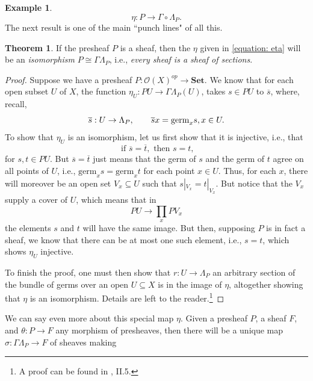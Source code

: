 \documentclass[11pt]{book}
\theoremstyle{definition}
\newtheorem{example}{Example}[section]
\theoremstyle{definition}
\theoremstyle{definition}
\newtheorem{theorem}{Theorem}[section]
\theoremstyle{theorem}
\theoremstyle{definition}
\begin{document}
\begin{example}
	\begin{equation}\label{equation: eta}
	\eta: P \rightarrow \Gamma \circ \Lambda_P.
	\end{equation}
	The next result is one of the main ``punch lines" of all this.  
	\begin{theorem}
		If the presheaf $P$ is a sheaf, then the $\eta$ given in \ref{equation: eta} will be an \textit{isomorphism} $P \cong \Gamma \Lambda_P$, i.e., \textit{every sheaf is a sheaf of sections}.
	\end{theorem} 
\begin{proof} 
	Suppose we have a presheaf $P: \mathscr{O}(X)^{op} \rightarrow \textbf{Set}$. We know that for each open subset $U$ of $X$, the function $\eta_U: PU \rightarrow \Gamma \Lambda_P (U)$, takes $s \in PU$ to $\overline{s}$, where, recall, 
	\begin{equation*}
	\overline{s}: U \rightarrow \Lambda_P, \hspace*{2em} \overline{s}x = \text{germ}_x s, x \in U.
	\end{equation*} 
	To show that $\eta_U$ is an isomorphism, let us first show that it is injective, i.e., that 
	\begin{equation*}
	\text{ if } \overline{s} = \overline{t}, \text{ then } s = t, 
	\end{equation*}
	for $s, t \in PU$. But $\overline{s} = \overline{t}$ just means that the germ of $s$ and the germ of $t$ agree on all points of $U$, i.e., $\text{germ}_x s = \text{germ}_x t$ for each point $x \in U$. Thus, for each $x$, there will moreover be an open set $V_x \subseteq  U$ such that $s|_{V_x} = t|_{V_x}$. But notice that the $V_x$ supply a cover of $U$, which means that in 
	\begin{equation*}
	PU \rightarrow \prod_x PV_x
	\end{equation*} 
	the elements $s$ and $t$ will have the same image. But then, supposing $P$ is in fact a sheaf, we know that there can be at most one such element, i.e., $s = t$, which shows $\eta_U$ injective. \par 
	To finish the proof, one must then show that $r: U \rightarrow \Lambda_P$ an arbitrary section of the bundle of germs over an open $U \subseteq  X$ is in the image of $\eta$, altogether showing that $\eta$ is an isomorphism. Details are left to the reader.\footnote{A proof can be found in \cite{maclane_sheaves_1994}, II.5.} 
\end{proof}
We can say even more about this special map $\eta$. Given a presheaf $P$, a sheaf $F$, and $\theta: P \rightarrow F$ any morphism of presheaves, then there will be a unique map $\sigma: \Gamma \Lambda_P \rightarrow F$ of sheaves making  

\end{example}
\end{document}
